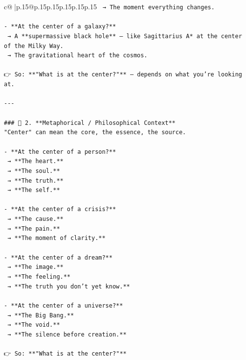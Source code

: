 \documentclass{article}
\begin{document}
{\begin{supertabular}{c@{$\;$}|p{.15\linewidth}@{}p{.15\linewidth}p{.15\linewidth}p{.15\linewidth}p{.15\linewidth}p{.15\linewidth}}
{{{\texttt{  → The moment everything changes.} \\
\\ 
\texttt{{-} **At the center of a galaxy?**  } \\
\texttt{  → A **supermassive black hole** — like Sagittarius A* at the center of the Milky Way.  } \\
\texttt{  → The gravitational heart of the cosmos.} \\
\\ 
\texttt{👉 So: **"What is at the center?"** — depends on what you're looking at.} \\
\\ 
\texttt{{-}{-}{-}} \\
\\ 
\texttt{\#\#\# 🔹 2. **Metaphorical / Philosophical Context**  } \\
\texttt{"Center" can mean the core, the essence, the source.} \\
\\ 
\texttt{{-} **At the center of a person?**  } \\
\texttt{  → **The heart.**  } \\
\texttt{  → **The soul.**  } \\
\texttt{  → **The truth.**  } \\
\texttt{  → **The self.**} \\
\\ 
\texttt{{-} **At the center of a crisis?**  } \\
\texttt{  → **The cause.**  } \\
\texttt{  → **The pain.**  } \\
\texttt{  → **The moment of clarity.**} \\
\\ 
\texttt{{-} **At the center of a dream?**  } \\
\texttt{  → **The image.**  } \\
\texttt{  → **The feeling.**  } \\
\texttt{  → **The truth you don’t yet know.**} \\
\\ 
\texttt{{-} **At the center of a universe?**  } \\
\texttt{  → **The Big Bang.**  } \\
\texttt{  → **The void.**  } \\
\texttt{  → **The silence before creation.**} \\
\\ 
\texttt{👉 So: **"What is at the center?"**  } \\
}}}
\end{supertabular}}
\end{document}
